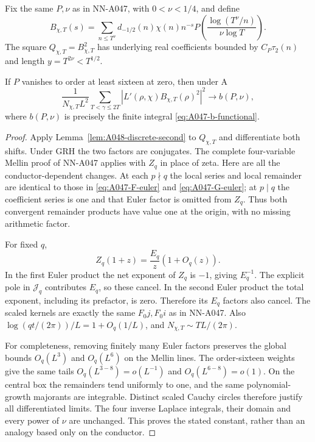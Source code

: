 Fix the same \(P,\nu\) as in NN-A047, with \(0<\nu<1/4\),
and define
\begin{equation}\label{eq:A048-mollifier}
 B_{\chi,T}(s)=
 \sum_{n\le T^\nu}d_{-1/2}(n)\chi(n)n^{-s}
      P\left(\frac{\log(T^\nu/n)}{\nu\log T}\right).
\end{equation}
The square \(Q_{\chi,T}=B_{\chi,T}^2\) has underlying
real coefficients bounded by \(C_P\tau_2(n)\) and
length \(y=T^{2\nu}<T^{1/2}\).

\begin{corollary}
\label{cor:A048-second-constant}
If \(P\) vanishes to order at least sixteen at zero,
then under A
\[
 \frac1{N_{\chi,T}L^2}
 \sum_{T<\gamma\le2T}
       |L'(\rho,\chi)B_{\chi,T}(\rho)^2|^2
                  \longrightarrow b(P,\nu),
\]
where \(b(P,\nu)\) is precisely the finite integral
\eqref{eq:A047-b-functional}.
\end{corollary}

\begin{proof}
Apply Lemma~\ref{lem:A048-discrete-second} to \(Q_{\chi,T}\)
and differentiate both shifts. Under GRH the two factors
are conjugates. The complete four-variable Mellin proof
of NN-A047 applies with \(Z_q\) in place of zeta.
Here are all the conductor-dependent changes.
At each \(p\nmid q\) the local series and local
remainder are identical to those in
\eqref{eq:A047-F-euler} and \eqref{eq:A047-G-euler};
at \(p\mid q\) the coefficient series is one and
that Euler factor is omitted from \(Z_q\).
Thus both convergent remainder products have value
one at the origin, with no missing arithmetic factor.

For fixed \(q\),
\[
 Z_q(1+z)=\frac{E_q}{z}(1+O_q(z)).
\]
In the first Euler product the net exponent of
\(Z_q\) is \(-1\), giving \(E_q^{-1}\).
The explicit pole in \(\mathcal J_q\) contributes
\(E_q\), so these cancel. In the second Euler product
the total exponent, including its prefactor, is
zero. Therefore its \(E_q\) factors also cancel.
The scaled kernels are exactly the same
\(F_0j,F_0i\) as in NN-A047.
Also \(\log(qt/(2\pi))/L=1+O_q(1/L)\), and
\(N_{\chi,T}\sim TL/(2\pi)\).

For completeness, removing finitely many Euler factors
preserves the global bounds \(O_q(L^3)\) and
\(O_q(L^6)\) on the Mellin lines. The order-sixteen
weights give the same tails
\(O_q(L^{3-8})=o(L^{-1})\) and
\(O_q(L^{6-8})=o(1)\).
On the central box the remainders tend uniformly
to one, and the same polynomial-growth majorants
are integrable. Distinct scaled Cauchy circles
therefore justify all differentiated limits.
The four inverse Laplace integrals, their domain
and every power of \(\nu\) are unchanged.
This proves the stated constant, rather than an
analogy based only on the conductor.
\end{proof}

